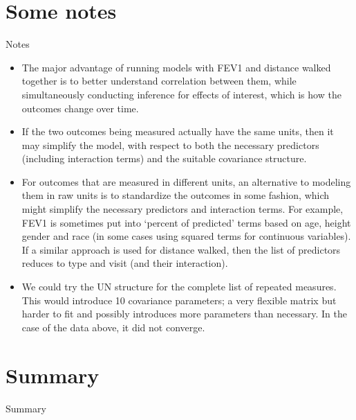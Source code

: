 \documentclass[
  9pt,
  ignorenonframetext,
]{beamer}
\begin{document}
\hypertarget{some-notes}{%
\section{Some notes}\label{some-notes}}

\begin{frame}{Notes}
\protect\hypertarget{notes}{}
\begin{itemize}
\item
  The major advantage of running models with FEV1 and distance walked
  together is to better understand correlation between them, while
  simultaneously conducting inference for effects of interest, which is
  how the outcomes change over time.
\item
  If the two outcomes being measured actually have the same units, then
  it may simplify the model, with respect to both the necessary
  predictors (including interaction terms) and the suitable covariance
  structure.
\item
  For outcomes that are measured in different units, an alternative to
  modeling them in raw units is to standardize the outcomes in some
  fashion, which might simplify the necessary predictors and interaction
  terms. For example, FEV1 is sometimes put into `percent of predicted'
  terms based on age, height gender and race (in some cases using
  squared terms for continuous variables). If a similar approach is used
  for distance walked, then the list of predictors reduces to type and
  visit (and their interaction).
\item
  We could try the UN structure for the complete list of repeated
  measures. This would introduce 10 covariance parameters; a very
  flexible matrix but harder to fit and possibly introduces more
  parameters than necessary. In the case of the data above, it did not
  converge.
\end{itemize}
\end{frame}

\hypertarget{summary}{%
\section{Summary}\label{summary}}

\begin{frame}{Summary}
\protect\hypertarget{summary-1}{}
\end{frame}
\end{document}
